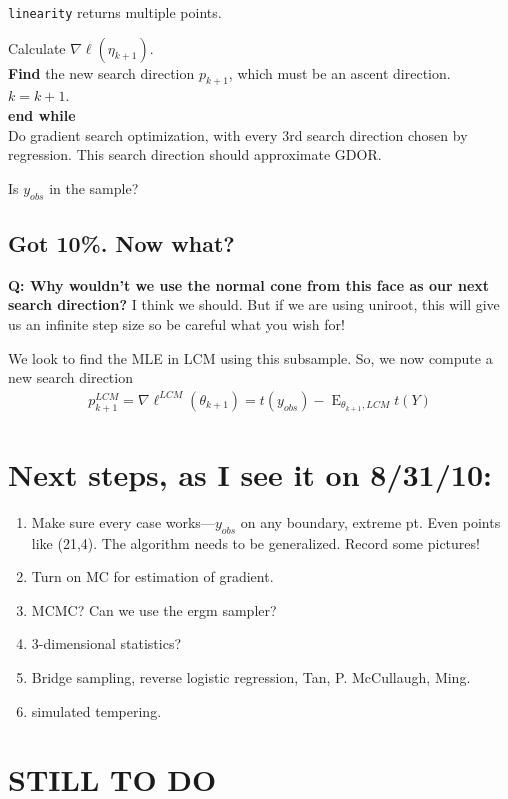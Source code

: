 \documentclass{amsbook}
\DeclareMathOperator{\E}{E}
\theoremstyle{definition}
\theoremstyle{remark}
\begin{document}
\indent \indent \texttt{linearity} returns multiple points.


\indent Calculate $\nabla \ell( \eta_{k+1})$.\\
\indent \textbf{Find} the new search direction $p_{k+1}$, which must be an ascent direction. \\
\indent $k = k + 1$.  \\
\textbf{end while}\\


Do gradient search optimization, with every 3rd search direction chosen by regression.  
This search direction should approximate GDOR.

Is $y_{obs}$ in the sample?

\subsection{Got 10\%.  Now what?}

\textbf{Q: Why wouldn't we use the normal cone from this face as our next search 
direction?}
I think we should.  But if we are using uniroot, this will give us an infinite step 
size so be careful what you wish for!

We look to find the MLE in LCM using this subsample.  So, we now compute a new search 
direction
\begin{align*}
	p_{k+1}^{LCM} = \nabla \ell^{LCM}(\theta_{k+1}) = t(y_{obs}) - \E_{\theta_{k+1}, 
LCM}t(Y)
\end{align*}

\newpage
\section{Next steps, as I see it on 8/31/10:}
\begin{enumerate}
\item Make sure every case works---$y_{obs}$ on any boundary, extreme pt.  Even points 
like (21,4).  The algorithm needs to be generalized.  Record some pictures!
\item Turn on MC for estimation of gradient.  
\item MCMC?  Can we use the ergm sampler?
\item 3-dimensional statistics?
\item Bridge sampling, reverse logistic regression, Tan, P. McCullaugh, Ming.
\item simulated tempering.
\end{enumerate}

\section{STILL TO DO}
\end{document}
